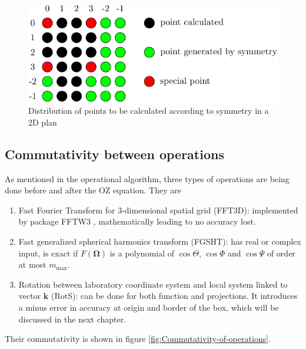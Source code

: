 \begin{figure}[h]
\begin{centering}
\includegraphics{_figure/test_lmn}
\par\end{centering}

\caption{Distribution of points to be calculated according to symmetry in a
2D plan}
\end{figure}



\subsection{Commutativity between operations\label{sub:Commutativity-between-operations}}

As mentioned in the operational algorithm, three types of operations
are being done before and after the OZ equation. They are
\begin{enumerate}
\item Fast Fourier Transform for 3-dimensional spatial grid (FFT3D): implemented
by package FFTW3 \citep{FFTW3}, mathematically leading to no accuracy
lost.
\item Fast generalized spherical harmonics transform (FGSHT): has real or
complex input, is exact if $F(\mathbf{\Omega})$ is a polynomial of
$\cos\Theta$, $\cos\Phi$ and $\cos\Psi$ of order at most $m_{\mathrm{max}}$.
\item Rotation between laboratory coordinate system and local system linked
to vector $\mathbf{k}$ (RotS): can be done for both function and
projections. It introduces a minus error in accuracy at origin and
border of the box, which will be discussed in the next chapter.
\end{enumerate}
Their commutativity is shown in figure \ref{fig:Commutativity-of-operations}.

